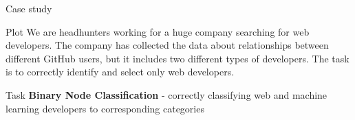 \begin{frame}{Case study}
\begin{center}
\begin{block}{Plot}
    We are headhunters working for a huge company searching for web developers. The company has collected the data about relationships between different GitHub users, but it includes two different types of developers. The task is to correctly identify and select only web developers.
\end{block}
\begin{block}{Task}
    \textbf{Binary Node Classification} - correctly classifying web and machine learning developers to corresponding categories
\end{block}
\end{center}
\end{frame}